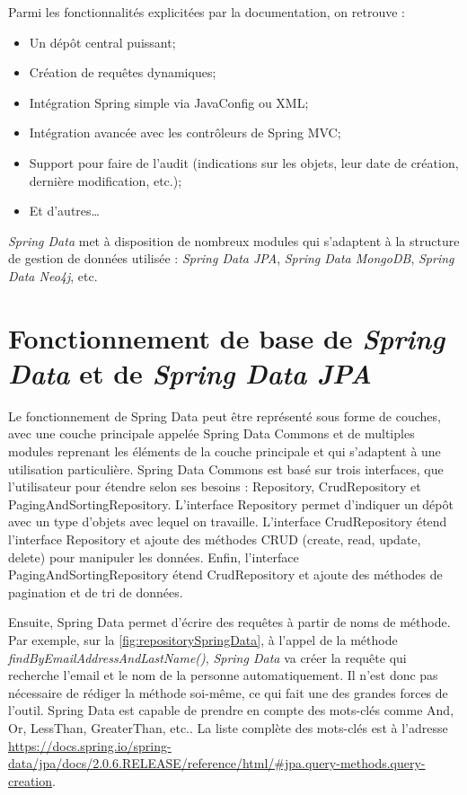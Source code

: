 \documentclass{polytech/polytech}
\begin{document}
Parmi les fonctionnalités explicitées par la documentation, on retrouve :

\begin{itemize}
	\item Un dépôt central puissant;
	\item Création de requêtes dynamiques; 
	\item Intégration Spring simple via JavaConfig ou XML;
	\item Intégration avancée avec les contrôleurs de Spring MVC;
	\item Support pour faire de l’audit (indications sur les objets, leur date de création, dernière modification, etc.);
	\item Et d’autres…
\end{itemize}

\textit{Spring Data} met à disposition de nombreux modules qui s’adaptent à la structure de gestion de données utilisée : \textit{Spring Data JPA}, \textit{Spring Data MongoDB}, \textit{Spring Data Neo4j}, etc.

\section{Fonctionnement de base de \textit{Spring Data} et de \textit{Spring Data JPA}}

Le fonctionnement de Spring Data peut être représenté sous forme de couches, avec une couche principale appelée Spring Data Commons et de multiples modules reprenant les éléments de la couche principale et qui s’adaptent à une utilisation particulière. Spring Data Commons est basé sur trois interfaces, que l’utilisateur pour étendre selon ses besoins : Repository, CrudRepository et PagingAndSortingRepository. L’interface Repository permet d’indiquer un dépôt avec un type d’objets avec lequel on travaille. L’interface CrudRepository étend l’interface Repository et ajoute des méthodes CRUD (create, read, update, delete) pour manipuler les données. Enfin, l’interface PagingAndSortingRepository étend CrudRepository et ajoute des méthodes de pagination et de tri de données.

Ensuite, Spring Data permet d’écrire des requêtes à partir de noms de méthode. Par exemple, sur la \autoref{fig:repositorySpringData}, à l’appel de la méthode \textit{findByEmailAddressAndLastName()}, \textit{Spring Data} va créer la requête qui recherche l’email et le nom de la personne automatiquement. Il n’est donc pas nécessaire de rédiger la méthode soi-même, ce qui fait une des grandes forces de l’outil. Spring Data est capable de prendre en compte des mots-clés comme And, Or, LessThan, GreaterThan, etc.. La liste complète des mots-clés est à l’adresse \url{https://docs.spring.io/spring-data/jpa/docs/2.0.6.RELEASE/reference/html/#jpa.query-methods.query-creation}.
\end{document}
